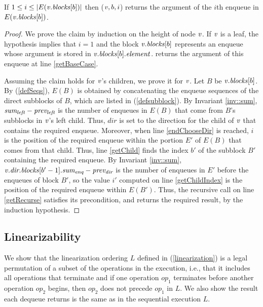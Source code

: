 \begin{lemma}\label{lem::get}
If $1\leq i\leq |E(\mbox{\textnormal{\textit{v}}}.\mbox{\textit{blocks}}[b])|$ then ($\mbox{\textnormal{\textit{v}}},b,i$) returns the argument of the $i$th enqueue in $E(\mbox{\textnormal{\textit{v}}}.\mbox{\textit{blocks}}[b])$.
\end{lemma}

\begin{proof}
We prove the claim by induction on the height of node $\mbox{\textnormal{\textit{v}}}$.
If $\mbox{\textnormal{\textit{v}}}$ is a leaf, the hypothesis implies that $i=1$ and the block $\mbox{\textnormal{\textit{v}}}.\mbox{\textit{blocks}}[b]$ represents 
an enqueue whose argument is stored in $\mbox{\textnormal{\textit{v}}}.\mbox{\textit{blocks}}[b].\mbox{\textit{element}}$.
 returns the argument of this enqueue at line \ref{getBaseCase}.

Assuming the claim holds for $\mbox{\textnormal{\textit{v}}}$'s children, we prove it for $\mbox{\textnormal{\textit{v}}}$.
Let $B$ be $\mbox{\textnormal{\textit{v}}}.\mbox{\textit{blocks}}[b]$.
By (\ref{defSeqs}),
$E(B)$ is obtained by concatenating the enqueue sequences of the direct subblocks
of $B$, which are listed in (\ref{defsubblock}).
By Invariant \ref{inv::sum}, $\mbox{\textnormal{\textit{sum\textsubscript{left}}}}-\mbox{\textnormal{\textit{prev\textsubscript{left}}}}$ is the number
of enqueues in $E(B)$ that come from $B$'s subblocks in $\mbox{\textnormal{\textit{v}}}$'s left child.
Thus, $dir$ is set to the direction for the child of $\mbox{\textnormal{\textit{v}}}$ that contains the required enqueue.
Moreover, when line \ref{endChooseDir} is reached, $i$ is the position of the required enqueue within the portion $E'$ of $E(B)$ that comes from that child.
Thus,  line \ref{getChild} finds the index $b'$ of the subblock $B'$ containing the required enqueue.
By Invariant \ref{inv::sum}, $\mbox{\textnormal{\textit{v}}}.\mbox{\textnormal{\textit{dir.blocks}}}[b'-1].\mbox{\textnormal{\textit{sum\textsubscript{enq}}}} - \mbox{\textnormal{\textit{prev\textsubscript{dir}}}}$ is the number of 
enqueues in $E'$ before the enqueues of block $B'$, so
the value $i'$ computed on line \ref{getChildIndex} is the position of the required enqueue within $E(B')$.
Thus, the recursive call on line \ref{getRecurse} satisfies its precondition, and 
returns the required result, by the induction hypothesis.
\end{proof}

\subsection{Linearizability}
\label{sec::linearizability}

We show that the linearization ordering $L$ defined in 
(\ref{linearization}) is a legal permutation of a subset of the operations in 
the execution, i.e., that it includes all operations that terminate and 
if one operation $op_1$ terminates before another operation $op_2$ begins, then $op_2$ does not precede $op_1$ in $L$.  We also show the result each dequeue returns is the same as in the sequential execution  $L$.

